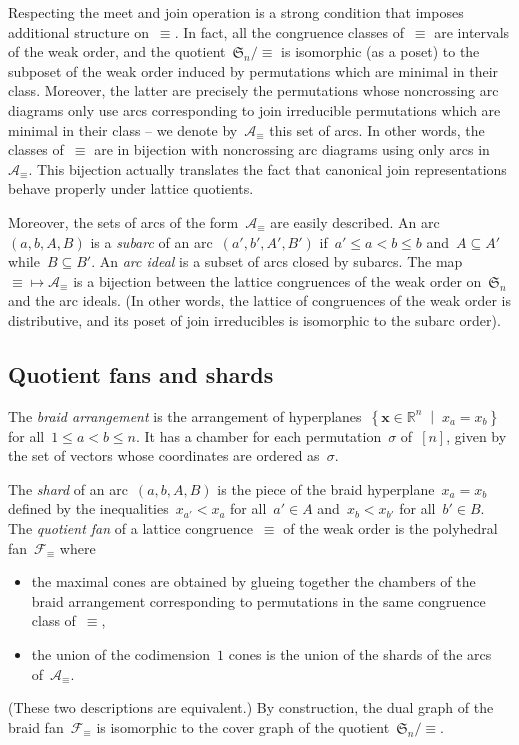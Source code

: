 \documentclass{amsart}
\theoremstyle{definition}
\newcommand{\R}{\mathbb{R}} %
\renewcommand{\c}[1]{\mathcal{#1}} %
\renewcommand{\b}[1]{{\boldsymbol{#1}}} %
\newcommand{\f}[1]{\mathfrak{#1}} %
\newcommand{\set}[2]{\left\{ #1 \;\middle|\; #2 \right\}} %
\newcommand{\eqdef}{\mbox{\,\raisebox{0.2ex}{\scriptsize\ensuremath{\mathrm:}}\ensuremath{=}\,}} %
\newcommand{\darkblue}{\color{darkblue}} %
\newcommand{\defn}[1]{\textsl{\darkblue #1}} %
\begin{document}
Respecting the meet and join operation is a strong condition that imposes additional structure on~$\equiv$.
In fact, all the congruence classes of~$\equiv$ are intervals of the weak order, and the quotient~$\f{S}_n/{\equiv}$ is isomorphic (as a poset) to the subposet of the weak order induced by permutations which are minimal in their class.
Moreover, the latter are precisely the permutations whose noncrossing arc diagrams only use arcs corresponding to join irreducible permutations which are minimal in their class -- we denote by~$\c{A}_\equiv$ this set of arcs.
In other words, the classes of~$\equiv$ are in bijection with noncrossing arc diagrams using only arcs in~$\c{A}_\equiv$.
This bijection actually translates the fact that canonical join representations behave properly under lattice quotients.

Moreover, the sets of arcs of the form~$\c{A}_\equiv$ are easily described.
An arc~$(a, b, A, B)$ is a \defn{subarc} of an arc~$(a', b', A', B')$ if~$a' \le a < b \le b$ and~$A \subseteq A'$ while~$B \subseteq B'$.
An \defn{arc ideal} is a subset of arcs closed by subarcs.
The map~${\equiv} \mapsto \c{A}_\equiv$ is a bijection between the lattice congruences of the weak order on~$\f{S}_n$ and the arc ideals.
(In other words, the lattice of congruences of the weak order is distributive, and its poset of join irreducibles is isomorphic to the subarc order).

\subsection{Quotient fans and shards}

The \defn{braid arrangement} is the arrangement of hyperplanes~$\set{\b{x} \in \R^n}{x_a = x_b}$ for all~$1 \le a < b \le n$.
It has a chamber for each permutation~$\sigma$ of~$[n]$, given by the set of vectors whose coordinates are ordered as~$\sigma$.

The \defn{shard} of an arc~$(a, b, A, B)$ is the piece of the braid hyperplane~${x_a = x_b}$ defined by the inequalities~$x_{a'} < x_a$ for all~$a' \in A$ and~$x_b < x_{b'}$ for all~$b' \in B$.
The \defn{quotient fan} of a lattice congruence~$\equiv$ of the weak order is the polyhedral fan~$\c{F}_\equiv$ where
\begin{itemize}
\item the maximal cones are obtained by glueing together the chambers of the braid arrangement corresponding to permutations in the same congruence class of~$\equiv$,
\item the union of the codimension~$1$ cones is the union of the shards of the arcs of~$\c{A}_\equiv$.
\end{itemize}
(These two descriptions are equivalent.)
By construction, the dual graph of the braid fan~$\c{F}_\equiv$ is isomorphic to the cover graph of the quotient~$\f{S}_n/{\equiv}$.
\end{document}
